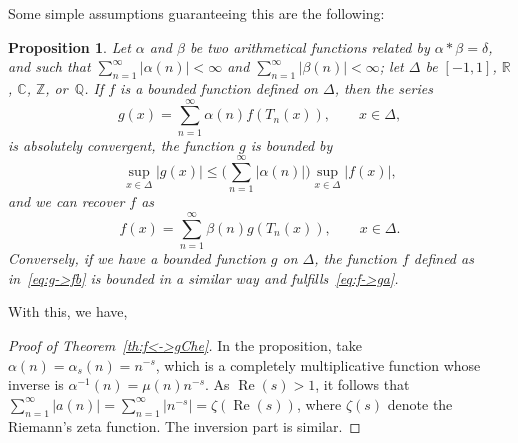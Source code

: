\documentclass[10pt,a4paper]{amsart}
\theoremstyle{plain}
\newtheorem{proposition}{Proposition}
\theoremstyle{remark}
\renewcommand{\Re}{\operatorname{Re}}
\newcommand{\Q}{\mathbb{Q}}
\newcommand{\R}{\mathbb{R}}
\newcommand{\C}{\mathbb{C}}
\newcommand{\Z}{\mathbb{Z}}
\begin{document}
Some simple assumptions guaranteeing this are the following:

\begin{proposition}
\label{prop:bounded}
Let $\alpha$ and $\beta$ be two arithmetical functions related by $\alpha*\beta = \delta$, and such that $\sum_{n=1}^\infty |\alpha(n)| < \infty$ and $\sum_{n=1}^\infty |\beta(n)| < \infty$; let $\Delta$ be $[-1,1]$, $\R$, $\C$, $\Z$, or~$\Q$.
If $f$ is a bounded function defined on $\Delta$, then the series
\begin{equation}
\label{eq:f->ga}
  g(x) = \sum_{n=1}^\infty \alpha(n) f(T_n(x)), \qquad x \in \Delta,
\end{equation}
is absolutely convergent, the function $g$ is bounded by
\begin{equation}
\label{eq:boundg}
  \sup_{x \in \Delta} |g(x)|
  \le \Big( \sum_{n=1}^\infty |\alpha(n)| \Big) \sup_{x \in \Delta} |f(x)|,
\end{equation}
and we can recover $f$ as
\begin{equation}
\label{eq:g->fb}
  f(x) = \sum_{n=1}^\infty \beta(n) g(T_n(x)), \qquad x \in \Delta.
\end{equation}
Conversely, if we have a bounded function $g$ on $\Delta$, the function
$f$ defined as in~\eqref{eq:g->fb} is bounded in a similar way and
fulfills~\eqref{eq:f->ga}.
\end{proposition}



With this, we have,

\begin{proof}[Proof of Theorem~\ref{th:f<->gChe}]
In the proposition, take $\alpha(n) = \alpha_s(n) = n^{-s}$,
which is a completely multiplicative function whose inverse is
$\alpha^{-1}(n) = \mu(n) n^{-s}$.
As $\Re(s)>1$, it follows that $\sum_{n=1}^\infty |a(n)|
= \sum_{n=1}^\infty |n^{-s}| = \zeta(\Re(s))$, where
$\zeta(s)$ denote the Riemann's zeta function.
The inversion part is similar.
\end{proof}
\end{document}
